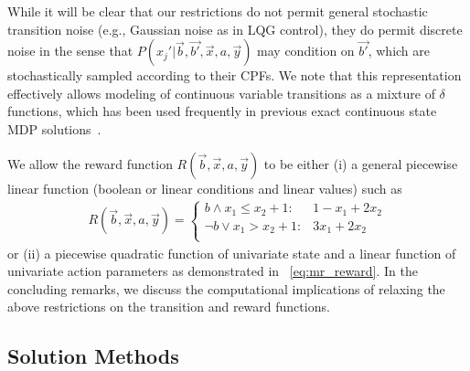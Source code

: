While it will be clear
that our restrictions do not permit general stochastic transition
noise (e.g., Gaussian noise as in LQG control), they do permit
discrete noise in the sense that
$P(x_j'|\vec{b},\vec{b'},\vec{x},a,\vec{y})$ may condition on
$\vec{b'}$, which are stochastically sampled according to their CPFs.
We note that this representation effectively allows modeling of
continuous variable transitions as a mixture of $\delta$ functions,
which has been used frequently in previous exact continuous state MDP
solutions~\cite{feng04,hao09}.


We allow the reward function $R(\vec{b},\vec{x},a,\vec{y})$ to be either
(i) a general piecewise linear function (boolean or linear conditions
and linear values) such as
\begin{align}
R(\vec{b},\vec{x},a,\vec{y}) = \begin{cases}
b \land x_1 \leq x_2 + 1 : & 1 - x_1 + 2x_2 \\
\neg b \lor x_1 > x_2 + 1:     & 3x_1 + 2x_2 \\
\end{cases} \label{eq:linear_reward}
\end{align}
or (ii) a piecewise quadratic function of univariate state 
and a linear function of univariate action parameters 
as demonstrated in \MarsRover~\eqref{eq:mr_reward}.  
In the concluding remarks, we discuss the
computational implications of relaxing the above restrictions on the
transition and reward functions.

\subsection{Solution Methods}

\label{sec:soln}

